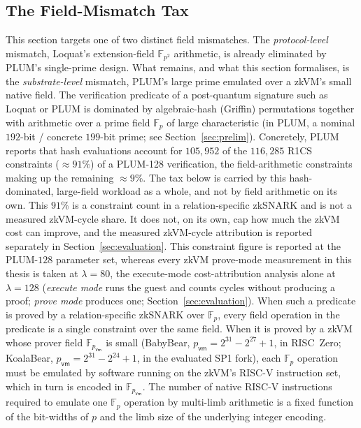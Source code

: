 \subsection{The Field-Mismatch Tax}\label{ssec:field-mismatch-tax}
This section targets one of two distinct field mismatches. The \emph{protocol-level} mismatch, Loquat's extension-field $\mathbb{F}_{p^2}$ arithmetic, is already eliminated by PLUM's single-prime design. What remains, and what this section formalises, is the \emph{substrate-level} mismatch, PLUM's large prime emulated over a zkVM's small native field. The verification predicate of a post-quantum signature such as Loquat or PLUM is dominated by algebraic-hash (Griffin) permutations together with arithmetic over a prime field $\mathbb{F}_p$ of large characteristic (in PLUM, a nominal $192$-bit / concrete $199$-bit prime; see Section~\ref{sec:prelim}). Concretely, PLUM~\cite[\S4.2]{10.1007/978-981-95-2961-2_6} reports that hash evaluations account for $105{,}952$ of the $116{,}285$ R1CS constraints ($\approx 91\%$) of a PLUM-128 verification, the field-arithmetic constraints making up the remaining $\approx 9\%$. The tax below is carried by this hash-dominated, large-field workload as a whole, and not by field arithmetic on its own. This $91\%$ is a constraint count in a relation-specific zkSNARK and is not a measured zkVM-cycle share. It does not, on its own, cap how much the zkVM cost can improve, and the measured zkVM-cycle attribution is reported separately in Section~\ref{sec:evaluation}. This constraint figure is reported at the PLUM-$128$ parameter set, whereas every zkVM prove-mode measurement in this thesis is taken at $\lambda=80$, the execute-mode cost-attribution analysis alone at $\lambda=128$ (\emph{execute mode} runs the guest and counts cycles without producing a proof; \emph{prove mode} produces one; Section~\ref{sec:evaluation}). When such a predicate is proved by a relation-specific zkSNARK over $\mathbb{F}_p$, every field operation in the predicate is a single constraint over the same field. When it is proved by a zkVM whose prover field $\mathbb{F}_{p_{\mathsf{vm}}}$ is small (BabyBear, $p_{\mathsf{vm}} = 2^{31} - 2^{27} + 1$, in RISC~Zero; KoalaBear, $p_{\mathsf{vm}} = 2^{31} - 2^{24} + 1$, in the evaluated SP1 fork), each $\mathbb{F}_p$ operation must be emulated by software running on the zkVM's RISC-V instruction set, which in turn is encoded in $\mathbb{F}_{p_{\mathsf{vm}}}$. The number of native RISC-V instructions required to emulate one $\mathbb{F}_p$ operation by multi-limb arithmetic is a fixed function of the bit-widths of $p$ and the limb size of the underlying integer encoding.

